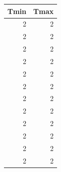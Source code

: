 \documentclass[
]{book}
\begin{document}
\begingroup\fontsize{10}{12}\selectfont

\begin{tabular}{r|r}
\hline
Tmin & Tmax\\
\hline
2 & 2\\
\hline
2 & 2\\
\hline
2 & 2\\
\hline
2 & 2\\
\hline
2 & 2\\
\hline
2 & 2\\
\hline
2 & 2\\
\hline
2 & 2\\
\hline
2 & 2\\
\hline
2 & 2\\
\hline
2 & 2\\
\hline
2 & 2\\
\hline
\end{tabular}
\endgroup{}
\end{document}
